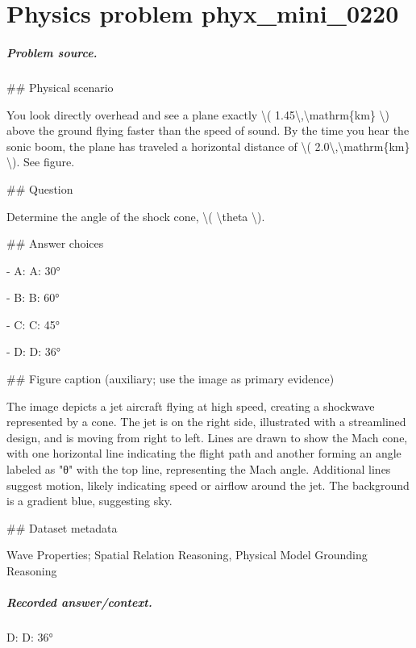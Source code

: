 
\chapter{Physics problem phyx\_mini\_0220}
\label{ch:PhyXMiniProblems_problem_phyx_mini_0220}

\paragraph{Problem source.}
\#\# Physical scenario

You look directly overhead and see a plane exactly \textbackslash{}( 1.45\textbackslash{},\textbackslash{}mathrm\{km\} \textbackslash{}) above the ground flying faster than the speed of sound. By the time you hear the sonic boom, the plane has traveled a horizontal distance of \textbackslash{}( 2.0\textbackslash{},\textbackslash{}mathrm\{km\} \textbackslash{}). See figure.

\#\# Question

Determine the angle of the shock cone, \textbackslash{}( \textbackslash{}theta \textbackslash{}).

\#\# Answer choices

- A: A: 30°

- B: B: 60°

- C: C: 45°

- D: D: 36°

\#\# Figure caption (auxiliary; use the image as primary evidence)

The image depicts a jet aircraft flying at high speed, creating a shockwave represented by a cone. The jet is on the right side, illustrated with a streamlined design, and is moving from right to left. Lines are drawn to show the Mach cone, with one horizontal line indicating the flight path and another forming an angle labeled as "θ" with the top line, representing the Mach angle. Additional lines suggest motion, likely indicating speed or airflow around the jet. The background is a gradient blue, suggesting sky.

\#\# Dataset metadata

Wave Properties; Spatial Relation Reasoning, Physical Model Grounding Reasoning

\paragraph{Recorded answer/context.}
D: D: 36°

